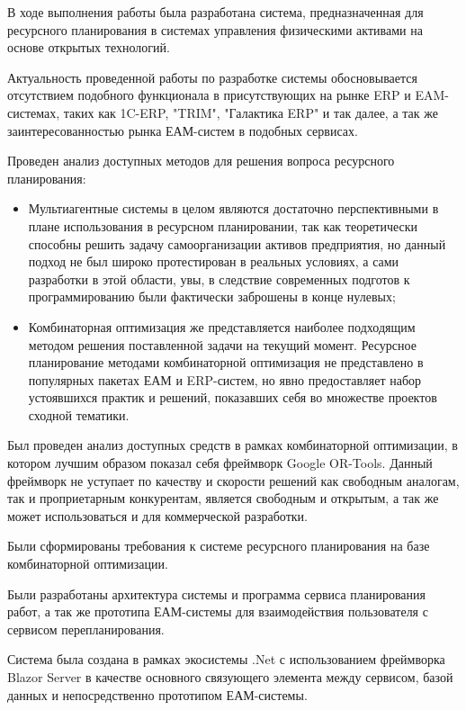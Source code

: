 
В ходе выполнения работы была разработана система, предназначенная для ресурсного планирования в системах управления физическими активами на основе открытых технологий.

Актуальность проведенной работы по разработке системы обосновывается отсутствием подобного функционала в присутствующих на рынке ERP и EAM-системах, таких как 1C-ERP, "TRIM", "Галактика ERP" и так далее, а так же заинтересованностью рынка ЕАМ-систем в подобных сервисах.

Проведен анализ доступных методов для решения вопроса ресурсного планирования:
\begin{itemize}
    \item Мультиагентные системы в целом являются достаточно перспективными в плане использования в ресурсном планировании, так как теоретически способны решить задачу самоорганизации активов предприятия, но данный подход не был широко протестирован в реальных условиях, а сами разработки в этой области, увы, в следствие современных подготов к программированию были фактически заброшены в конце нулевых;
    \item Комбинаторная оптимизация же представляется наиболее подходящим методом решения поставленной задачи на текущий момент. Ресурсное планирование методами комбинаторной оптимизация не представлено в популярных пакетах ЕАМ и ERP-систем, но явно предоставляет набор устоявшихся практик и решений, показавших себя во множестве проектов сходной тематики.
\end{itemize}

Был проведен анализ доступных средств в рамках комбинаторной оптимизации, в котором лучшим образом показал себя фреймворк Google OR-Tools. Данный фреймворк не уступает по качеству и скорости решений как свободным аналогам, так и проприетарным конкурентам, является свободным и открытым, а так же может использоваться и для коммерческой разработки.

Были сформированы требования к системе ресурсного планирования на базе комбинаторной оптимизации.

Были разработаны архитектура системы и программа сервиса планирования работ, а так же прототипа ЕАМ-системы для взаимодействия пользователя с сервисом перепланирования.

Система была создана в рамках экосистемы .Net с использованием фреймворка Blazor Server в качестве основного связующего элемента между сервисом, базой данных и непосредственно прототипом ЕАМ-системы.

